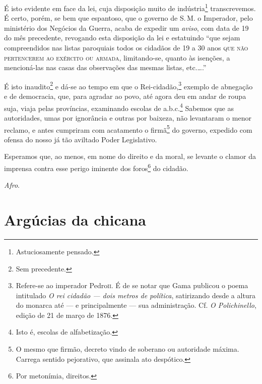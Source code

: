 É isto evidente em face da lei, cuja disposição muito de
indústria\footnote{ Astuciosamente pensado.} transcrevemos. É certo,
porém, se bem que espantoso, que o governo de S.\,M. o Imperador, pelo
ministério dos Negócios da Guerra, acaba de expedir um \emph{aviso}, com
data de 19 do mês precedente, revogando esta disposição da lei e
estatuindo ``que sejam compreendidos nas listas paroquiais todos os
cidadãos de 19 a 30 anos \textsc{que não pertencerem ao exército ou armada},
limitando-se, quanto às isenções, a mencioná-las nas casas das
observações das mesmas listas, etc.\ldots.''

É isto inaudito\footnote{ Sem precedente.} e dá-se ao tempo em que o
Rei-cidadão,\footnote{ Refere-se ao imperador Pedro\textsc{ii}. É de se notar
  que Gama publicou o poema intitulado \emph{O rei cidadão --- dois
  metros de política}, satirizando desde a altura do monarca até --- e
  principalmente --- sua administração. Cf. \emph{O Polichinello}, edição
  de 21 de março de 1876.} exemplo de abnegação e de democracia, que,
para agradar ao povo, até agora deu em andar de roupa suja, viaja pelas
províncias, examinando escolas de a.b.c.\footnote{ Isto é, escolas de
  alfabetização.} Sabemos que as autoridades, umas por ignorância e
outras por baixeza, não levantaram o menor reclamo, e antes cumpriram
com acatamento o firmã\footnote{ O mesmo que firmão, decreto vindo de
  soberano ou autoridade máxima. Carrega sentido pejorativo, que
  assinala ato despótico.} do governo, expedido com ofensa do nosso já
tão aviltado Poder Legislativo.

Esperamos que, ao menos, em nome do direito e da moral, se levante o
clamor da imprensa contra esse perigo iminente dos foros\footnote{ Por
  metonímia, direitos.} do cidadão.

\emph{Afro}.

\part{Argúcias da chicana}

